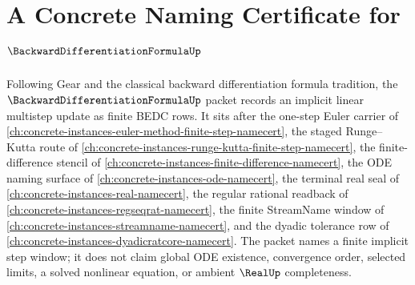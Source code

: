 \chapter{A Concrete Naming Certificate for $\BackwardDifferentiationFormulaUp$}
\label{ch:concrete-instances-backward-differentiation-formula-namecert}

Following Gear and the classical backward differentiation formula tradition, the $\BackwardDifferentiationFormulaUp$ packet records an implicit linear multistep update as finite BEDC rows. It sits after the one-step Euler carrier of \autoref{ch:concrete-instances-euler-method-finite-step-namecert}, the staged Runge--Kutta route of \autoref{ch:concrete-instances-runge-kutta-finite-step-namecert}, the finite-difference stencil of \autoref{ch:concrete-instances-finite-difference-namecert}, the ODE naming surface of \autoref{ch:concrete-instances-ode-namecert}, the terminal real seal of \autoref{ch:concrete-instances-real-namecert}, the regular rational readback of \autoref{ch:concrete-instances-regseqrat-namecert}, the finite StreamName window of \autoref{ch:concrete-instances-streamname-namecert}, and the dyadic tolerance row of \autoref{ch:concrete-instances-dyadicratcore-namecert}. The packet names a finite implicit step window; it does not claim global ODE existence, convergence order, selected limits, a solved nonlinear equation, or ambient $\RealUp$ completeness.

